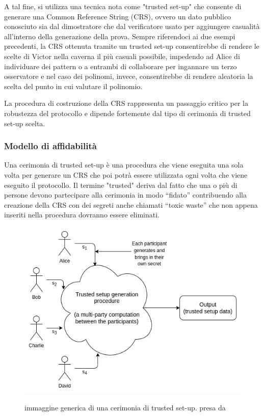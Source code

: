 A tal fine, si utilizza una tecnica nota come "trusted set-up" che consente di generare una Common Reference String
(CRS), ovvero un dato pubblico conosciuto sia dal dimostratore che dal verificatore usato per aggiungere casualità
all’interno della generazione della prova. Sempre riferendoci ai due esempi precedenti, la CRS ottenuta tramite un
trusted set-up consentirebbe di rendere le scelte di Victor nella caverna il più casuali possibile, impedendo ad Alice
di individuare dei pattern o a entrambi di collaborare per ingannare un terzo osservatore e nel caso dei polinomi,
invece, consentirebbe di rendere aleatoria la scelta del punto in cui valutare il polinomio. 

La procedura di costruzione della CRS rappresenta un passaggio critico per la robustezza del protocollo e dipende
fortemente dal tipo di cerimonia di trusted set-up scelta.

\subsubsection{Modello di affidabilità}

Una cerimonia di trusted set-up è una procedura che viene eseguita una sola volta per generare un CRS che poi potrà
essere utilizzata ogni volta che viene eseguito il protocollo. Il termine "trusted" deriva dal fatto che una o più di
persone devono partecipare alla cerimonia in modo “fidato” contribuendo alla creazione della CRS con dei segreti anche
chiamati “toxic waste” che non appena inseriti nella procedura dovranno essere eliminati. 

\begin{figure}[H]
    \centering
    \includegraphics[width=13cm]{./chapters/1.state-of-art/images/11.trusted_setups.png}
    \label{fig:trusted_setups}
    \captionsetup{justification=centering}
    \caption{immaggine generica di una cerimonia di trusted set-up. presa da \cite{how-do-trusted-setups-work}}
\end{figure}

